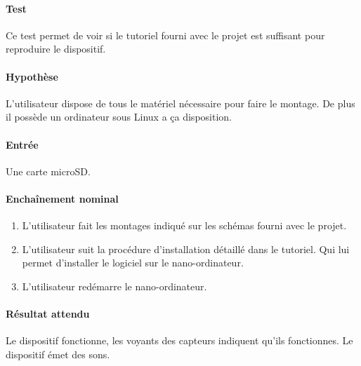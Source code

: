 \documentclass[a4paper, titlepage, oneside, 12pt]{article}%
\begin{document}
\paragraph{Test\\}
Ce test permet de voir si le tutoriel fourni avec le projet est suffisant pour reproduire le dispositif.
\paragraph{Hypothèse\\}
L'utilisateur dispose de tous le matériel nécessaire pour faire le montage.
De plus il possède un ordinateur sous Linux a ça disposition.

\paragraph{Entrée\\}
Une carte microSD.

\paragraph{Enchaînement nominal}
\begin {enumerate}
\item L'utilisateur fait les montages indiqué sur les schémas fourni avec le projet.
\item L'utilisateur suit la procédure d'installation détaillé dans le tutoriel. Qui lui permet d'installer le logiciel sur le nano-ordinateur.
\item L'utilisateur redémarre le nano-ordinateur.
\end{enumerate}

\paragraph{Résultat attendu\\}
Le dispositif fonctionne, les voyants des capteurs indiquent qu'ils fonctionnes. Le dispositif émet des sons.
\end{document}

